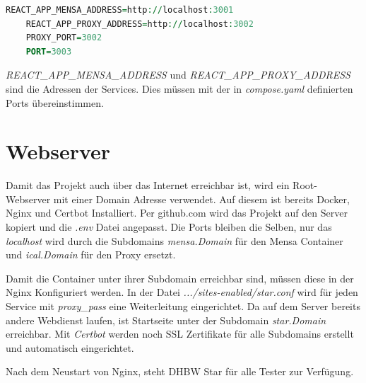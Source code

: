 \begin{lstlisting}[language=vhdl,
	frame=single,           % Ein Rahmen um den Code
	framexleftmargin=15pt,  % Rahmen link von den Zahlen
	style=algoBericht,
	label={Dockerfile},
	captionpos=b           % Caption unter den Code setzen
	caption={.env für DHBW-Star}]
	REACT_APP_MENSA_ADDRESS=http://localhost:3001 
	REACT_APP_PROXY_ADDRESS=http://localhost:3002
	PROXY_PORT=3002
	PORT=3003
\end{lstlisting}

\emph{REACT\_APP\_MENSA\_ADDRESS} und \emph{REACT\_APP\_PROXY\_ADDRESS} sind die Adressen der Services. Dies müssen mit der in \emph{compose.yaml} definierten Ports übereinstimmen. 

\section{Webserver}
Damit das Projekt auch über das Internet erreichbar ist, wird ein Root-Webserver mit einer Domain Adresse verwendet. Auf diesem ist bereits Docker, Nginx und Certbot Installiert.
Per github.com wird das Projekt auf den Server kopiert und die \emph{.env} Datei angepasst. Die Ports bleiben die Selben, nur das \emph{localhost} wird durch die Subdomains \emph{mensa.Domain} für den Mensa Container und \emph{ical.Domain} für den Proxy ersetzt.

Damit die Container unter ihrer Subdomain erreichbar sind, müssen diese in der Nginx Konfiguriert werden. In der Datei \emph{.../sites-enabled/star.conf} wird für jeden Service mit \emph{proxy\_pass} eine Weiterleitung eingerichtet.
Da auf dem Server bereits andere Webdienst laufen, ist Startseite unter der Subdomain \emph{star.Domain} erreichbar. Mit \emph{Certbot} werden noch SSL Zertifikate für alle Subdomains erstellt und automatisch eingerichtet.

Nach dem Neustart von Nginx, steht DHBW Star für alle Tester zur Verfügung.

